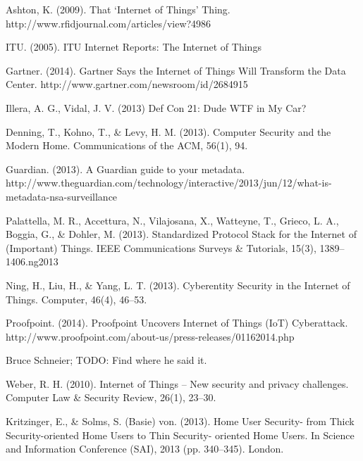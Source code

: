 \documentclass[12pt,journal,compsoc]{IEEEtran}
\begin{document}
\begin{thebibliography}{1}

Ashton, K. (2009). That `Internet of Things' Thing. http://www.rfidjournal.com/articles/view?4986

ITU. (2005). ITU Internet Reports: The Internet of Things

Gartner. (2014). Gartner Says the Internet of Things Will Transform the Data Center. http://www.gartner.com/newsroom/id/2684915

Illera, A. G., Vidal, J. V. (2013) Def Con 21: Dude WTF in My Car?  

Denning, T., Kohno, T., \& Levy, H. M. (2013). Computer Security and the Modern Home. Communications of the ACM, 56(1), 94. 

Guardian. (2013). A Guardian guide to your metadata. http://www.theguardian.com/technology/interactive/2013/jun/12/what-is-metadata-nsa-surveillance

Palattella, M. R., Accettura, N., Vilajosana, X., Watteyne, T., Grieco, L. A., Boggia, G., \& Dohler, M. (2013). Standardized Protocol Stack for the Internet of (Important) Things. IEEE Communications Surveys \& Tutorials, 15(3), 1389–1406.ng2013 

Ning, H., Liu, H., \& Yang, L. T. (2013). Cyberentity Security in the Internet of Things. Computer, 46(4), 46–53. 

Proofpoint. (2014). Proofpoint Uncovers Internet of Things (IoT) Cyberattack. http://www.proofpoint.com/about-us/press-releases/01162014.php

Bruce Schneier; TODO: Find where he said it.

Weber, R. H. (2010). Internet of Things – New security and privacy challenges. Computer Law \& Security Review, 26(1), 23–30. 

Kritzinger, E., \& Solms, S. (Basie) von. (2013). Home User Security- from Thick Security-oriented Home Users to Thin Security- oriented Home Users. In Science and Information Conference (SAI), 2013 (pp. 340–345). London.

\end{thebibliography}



\end{document}
